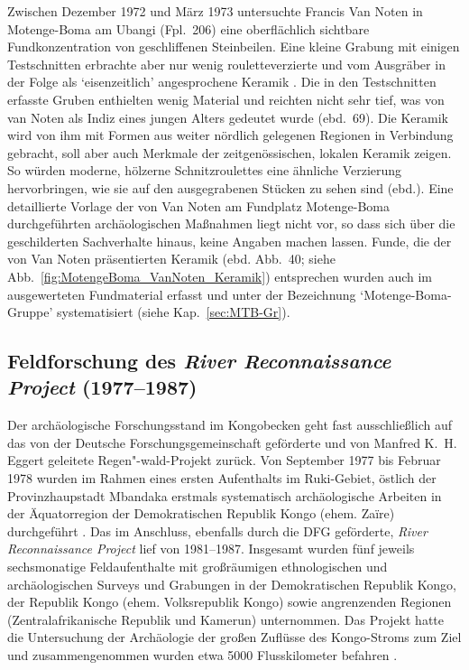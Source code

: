 Zwischen Dezember 1972 und März 1973 untersuchte Francis Van Noten in Motenge-Boma am Ubangi (Fpl.~206) eine oberflächlich sichtbare Fundkonzentration von geschliffenen Steinbeilen. Eine kleine Grabung mit einigen Testschnitten erbrachte aber nur wenig rouletteverzierte und vom Ausgräber in der Folge als \enquote*{eisenzeitlich} angesprochene Keramik \parencite[58]{vanNoten.1982}. Die in den Testschnitten erfasste Gruben enthielten wenig Material und reichten nicht sehr tief, was von van Noten als Indiz eines jungen Alters gedeutet wurde (ebd.~69). Die Keramik wird von ihm mit Formen aus weiter nördlich gelegenen Regionen in Verbindung gebracht, soll aber auch Merkmale der zeitgenössischen, lokalen Keramik zeigen. So würden moderne, hölzerne Schnitzroulettes eine ähnliche Verzierung hervorbringen, wie sie auf den ausgegrabenen Stücken zu sehen sind (ebd.). Eine detaillierte Vorlage der von Van Noten am Fundplatz Motenge-Boma durchgeführten archäologischen Maßnahmen liegt nicht vor, so dass sich über die geschilderten Sachverhalte hinaus, keine Angaben machen lassen. Funde, die der von Van Noten präsentierten Keramik (ebd. Abb.~40; siehe Abb.~\ref{fig:MotengeBoma_VanNoten_Keramik}) entsprechen wurden auch im ausgewerteten Fundmaterial erfasst und unter der Bezeichnung \enquote*{Motenge-Boma-Gruppe} systematisiert (siehe Kap.~\ref{sec:MTB-Gr}).


\subsection*{Feldforschung des \textit{River Reconnaissance Project} (1977--1987)}

Der archäologische Forschungsstand im Kongobecken geht fast ausschließlich auf das von der Deutsche Forschungsgemeinschaft geförderte und von Manfred K.~H. Eggert geleitete Regen"-wald-Projekt zurück. Von September 1977 bis Februar 1978 wurden im Rahmen eines ersten Aufenthalts im Ruki-Gebiet, östlich der Provinzhaupstadt Mbandaka erstmals systematisch archäologische Arbeiten in der Äquatorregion der Demokratischen Republik Kongo (ehem. Zaïre) durchgeführt \parencites[407--426]{Eggert.1980b}[23f.]{Wotzka.1995}. Das im Anschluss, ebenfalls durch die DFG geförderte, \textit{River Reconnaissance Project} lief von 1981--1987. Insgesamt wurden fünf jeweils sechsmonatige Feldaufenthalte mit großräumigen ethnologischen und archäologischen Surveys und Grabungen in der Demokratischen Republik Kongo, der Republik Kongo (ehem. Volksrepublik Kongo) sowie angrenzenden Regionen (Zentralafrikanische Republik und Kamerun) unternommen. Das Projekt hatte die Untersuchung der Archäologie der großen Zuflüsse des Kongo-Stroms zum Ziel und zusammengenommen wurden etwa 5000 Flusskilometer befahren \parencite[295]{Eggert.1993}.

